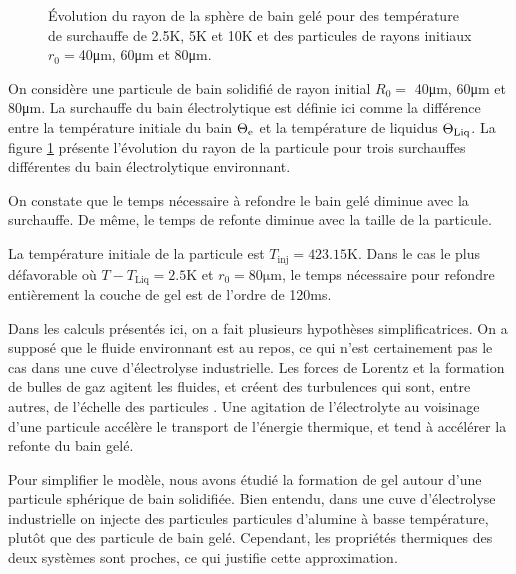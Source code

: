 \begin{figure}
\begin{center}
  
  
  
  \caption{Évolution du rayon de la sphère de bain gelé pour des
    température de surchauffe de \num{2.5}\si{\kelvin},
    \num{5}\si{\kelvin} et \num{10}\si{\kelvin} et des particules de
    rayons initiaux $r_0 = $\num{40}\si{\micro\meter},
    \num{60}\si{\micro\meter} et \num{80}\si{\micro\meter}.}
  \label{fig:freeze-radius}
\end{center}
\end{figure}
On considère une particule de bain solidifié de rayon initial $R_0 =$
\num{40}\si{\micro\meter}, \num{60}\si{\micro\meter} et
\num{80}\si{\micro\meter}. La surchauffe du bain électrolytique est
définie ici comme la différence entre la température initiale du bain
$\Theta_\mathrm{e}$ et la température de liquidus $\Theta_\text{Liq}$. La figure
\ref{fig:freeze-radius} présente l'évolution du rayon de la particule
pour trois surchauffes différentes du bain électrolytique environnant.

On constate que le temps nécessaire à refondre le bain gelé
diminue avec la surchauffe. De même, le temps de refonte diminue avec
la taille de la particule.

La température initiale de la particule est $T_\text{inj} =
423.15\si{\kelvin}$. Dans le cas le plus défavorable où $T -
T_\text{Liq} = 2.5\si{\kelvin}$ et $r_0 = 80\si{\micro\meter}$, le
temps nécessaire pour refondre entièrement la couche de gel est de
l'ordre de 120\si{\milli\second}.

Dans les calculs présentés ici, on a fait plusieurs hypothèses
simplificatrices. On a supposé que le fluide environnant est au
repos, ce qui n'est certainement pas le cas dans une cuve
d'électrolyse industrielle. Les forces de Lorentz et la formation de
bulles de gaz agitent les fluides, et créent des turbulences qui sont,
entre autres, de l'échelle des particules \cite{Rochat2016}. Une
agitation de l'électrolyte au voisinage d'une particule accélère le
transport de l'énergie thermique, et tend à accélérer la refonte du
bain gelé.

Pour simplifier le modèle, nous avons étudié la formation de gel
autour d'une particule sphérique de bain solidifiée. Bien entendu,
dans une cuve d'électrolyse industrielle on injecte des particules
particules d'alumine à basse température, plutôt que des particule de
bain gelé. Cependant, les propriétés thermiques des deux systèmes sont
proches, ce qui justifie cette approximation.

